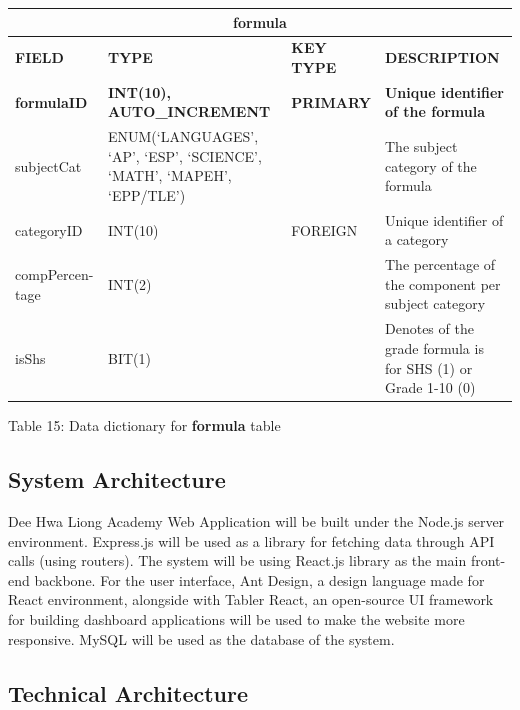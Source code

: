 \documentclass[11pt,a4paper,titlepage]{article}
\begin{document}
\vspace{1cm}
\begin{longtable}{ |p{2.5cm}|p{4.5cm}|p{2.5cm}|p{3cm}|  }
    \hline
    \multicolumn{4}{|c|}{\textbf{formula}} \\
    \hline
    \textbf{FIELD}&\textbf{TYPE}&\textbf{KEY TYPE}&\textbf{DESCRIPTION}\\
    \hline
    \textbf{formulaID}  & \textbf{INT(10), AUTO\_INCREMENT} & \textbf{PRIMARY} & \textbf{Unique identifier of the formula}\\ \hline
    subjectCat & ENUM(`LANGUAGES', `AP', `ESP', `SCIENCE', `MATH', `MAPEH', `EPP/TLE') & & The subject category of the formula\\ \hline
    categoryID & INT(10) & FOREIGN & Unique identifier of a category\\ \hline
    compPercen- tage & INT(2) & & The percentage of the component per subject category\\ \hline
    isShs & BIT(1) &  & Denotes of the grade formula is for SHS (1) or Grade 1-10 (0)\\ \hline

\end{longtable}

\vspace{.5cm}
\begin{center}
    Table 15: Data dictionary for \textbf{formula} table
\end{center}

\newpage

\subsection{System Architecture}

Dee Hwa Liong Academy Web Application will be built under the Node.js server environment. Express.js will be used as a library for fetching data through API calls (using routers). The system will be using React.js library as the main front-end backbone. For the user interface, Ant Design, a design language made for React environment, alongside with Tabler React, an open-source UI framework for building dashboard applications will be used to make the website more responsive. MySQL will be used as the database of the system.

\subsection{Technical Architecture}
\end{document}
